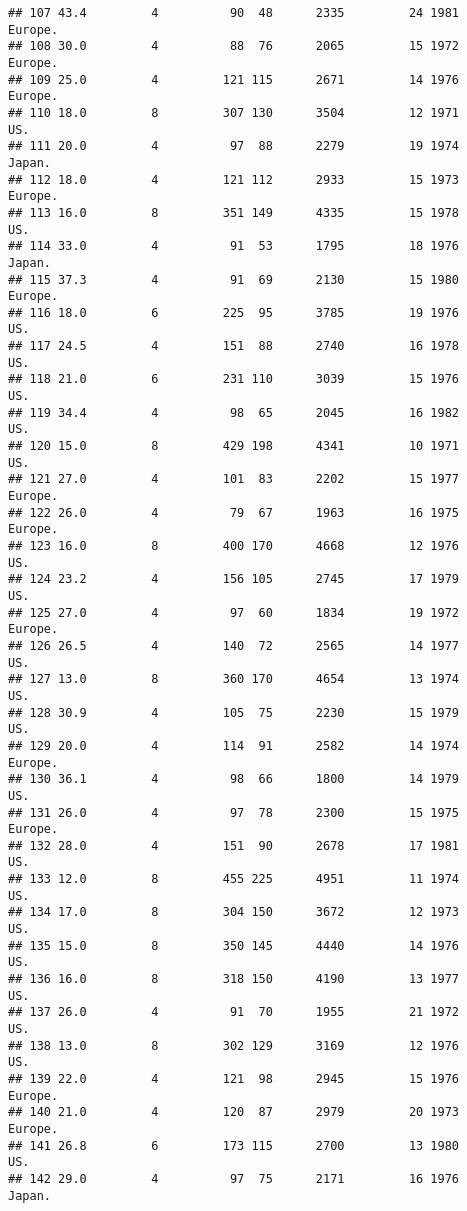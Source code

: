 \documentclass[11pt,]{article}
\begin{document}
\begin{verbatim}
## 107 43.4         4          90  48      2335         24 1981  Europe.
## 108 30.0         4          88  76      2065         15 1972  Europe.
## 109 25.0         4         121 115      2671         14 1976  Europe.
## 110 18.0         8         307 130      3504         12 1971      US.
## 111 20.0         4          97  88      2279         19 1974   Japan.
## 112 18.0         4         121 112      2933         15 1973  Europe.
## 113 16.0         8         351 149      4335         15 1978      US.
## 114 33.0         4          91  53      1795         18 1976   Japan.
## 115 37.3         4          91  69      2130         15 1980  Europe.
## 116 18.0         6         225  95      3785         19 1976      US.
## 117 24.5         4         151  88      2740         16 1978      US.
## 118 21.0         6         231 110      3039         15 1976      US.
## 119 34.4         4          98  65      2045         16 1982      US.
## 120 15.0         8         429 198      4341         10 1971      US.
## 121 27.0         4         101  83      2202         15 1977  Europe.
## 122 26.0         4          79  67      1963         16 1975  Europe.
## 123 16.0         8         400 170      4668         12 1976      US.
## 124 23.2         4         156 105      2745         17 1979      US.
## 125 27.0         4          97  60      1834         19 1972  Europe.
## 126 26.5         4         140  72      2565         14 1977      US.
## 127 13.0         8         360 170      4654         13 1974      US.
## 128 30.9         4         105  75      2230         15 1979      US.
## 129 20.0         4         114  91      2582         14 1974  Europe.
## 130 36.1         4          98  66      1800         14 1979      US.
## 131 26.0         4          97  78      2300         15 1975  Europe.
## 132 28.0         4         151  90      2678         17 1981      US.
## 133 12.0         8         455 225      4951         11 1974      US.
## 134 17.0         8         304 150      3672         12 1973      US.
## 135 15.0         8         350 145      4440         14 1976      US.
## 136 16.0         8         318 150      4190         13 1977      US.
## 137 26.0         4          91  70      1955         21 1972      US.
## 138 13.0         8         302 129      3169         12 1976      US.
## 139 22.0         4         121  98      2945         15 1976  Europe.
## 140 21.0         4         120  87      2979         20 1973  Europe.
## 141 26.8         6         173 115      2700         13 1980      US.
## 142 29.0         4          97  75      2171         16 1976   Japan.

\end{verbatim}
\end{document}
